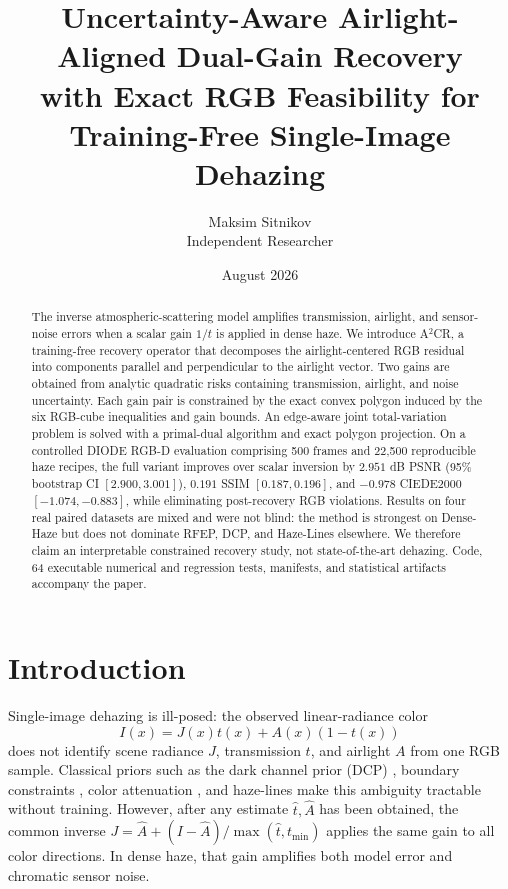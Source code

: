 \documentclass[10pt,twocolumn]{article}
\title{Uncertainty-Aware Airlight-Aligned Dual-Gain Recovery\\
with Exact RGB Feasibility for Training-Free Single-Image Dehazing}
\author{Maksim Sitnikov\\\small Independent Researcher}
\date{August 2026}
\newcommand{\method}{A$^2$CR}
\begin{document}
\maketitle

\begin{abstract}
The inverse atmospheric-scattering model amplifies transmission, airlight, and sensor-noise
errors when a scalar gain $1/t$ is applied in dense haze. We introduce \method, a training-free
recovery operator that decomposes the airlight-centered RGB residual into components parallel
and perpendicular to the airlight vector. Two gains are obtained from analytic quadratic risks
containing transmission, airlight, and noise uncertainty. Each gain pair is constrained by the
exact convex polygon induced by the six RGB-cube inequalities and gain bounds. An edge-aware
joint total-variation problem is solved with a primal-dual algorithm and exact polygon projection.
On a controlled DIODE RGB-D evaluation comprising 500 frames and 22,500 reproducible haze
recipes, the full variant improves over scalar inversion by $2.951$ dB PSNR (95\% bootstrap CI
$[2.900,3.001]$), $0.191$ SSIM $[0.187,0.196]$, and $-0.978$ CIEDE2000
$[-1.074,-0.883]$, while eliminating post-recovery RGB violations. Results on four real paired
datasets are mixed and were not blind: the method is strongest on Dense-Haze but does not
dominate RFEP, DCP, and Haze-Lines elsewhere. We therefore claim an interpretable constrained
recovery study, not state-of-the-art dehazing. Code, 64 executable numerical and regression tests,
manifests, and statistical artifacts accompany the paper.
\end{abstract}

\section{Introduction}
Single-image dehazing is ill-posed: the observed linear-radiance color
\begin{equation}
 I(x)=J(x)t(x)+A(x)(1-t(x))
 \label{eq:asm}
\end{equation}
does not identify scene radiance $J$, transmission $t$, and airlight $A$ from one RGB sample.
Classical priors such as the dark channel prior (DCP) \cite{he2011dcp}, boundary constraints
\cite{meng2013boundary}, color attenuation \cite{zhu2015cap}, and haze-lines
\cite{berman2016nonlocal} make this ambiguity tractable without training. However, after any
estimate $\hat t,\hat A$ has been obtained, the common inverse
$J=\hat A+(I-\hat A)/\max(\hat t,t_{\min})$ applies the same gain to all color directions.
In dense haze, that gain amplifies both model error and chromatic sensor noise.
\end{document}
